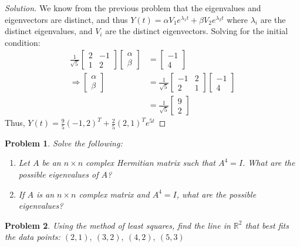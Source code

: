 \documentclass{article}
\theoremstyle{mystyle}
\newtheorem{problem}{Problem}[section]
\begin{document}
\begin{proof}[Solution]
We know from the previous problem that the eigenvalues and eigenvectors are distinct, and thus $Y(t) = \alpha V_1 e^{\lambda_1 t} + \beta V_2 e^{\lambda_2 t}$ where $\lambda_{i}$ are the distinct eigenvalues, and $V_{i}$ are the distinct eigenvectors. Solving for the initial condition:
%
\begin{align*}
    \frac{1}{\sqrt{5}}\begin{bmatrix} 2 & -1 \\ 1 & 2 \end{bmatrix}  \begin{bmatrix} \alpha \\ \beta \end{bmatrix} &= \begin{bmatrix} -1 \\ 4 \end{bmatrix}\\    
    \Rightarrow \begin{bmatrix} \alpha \\ \beta \end{bmatrix} &= \frac{1}{\sqrt{5}}\begin{bmatrix} -1 & 2 \\ 2 & 1 \end{bmatrix} \begin{bmatrix} -1 \\ 4 \end{bmatrix}\\
    &= \frac{1}{\sqrt{5}} \begin{bmatrix} 9 \\ 2 \end{bmatrix}
\end{align*}
Thus, $Y(t) = \frac{9}{5}(-1,2)^T + \frac{2}{5} (2,1)^T e^{5t}$ 
\end{proof}
\begin{problem}
Solve the following:
\begin{enumerate}
    \item Let $A$ be an $n\times n$ complex Hermitian matrix such that $A^4=I$. What are the possible eigenvalues of $A$?
    \item If $A$ is an $n\times n$ complex matrix and $A^4 = I$, what are the possible eigenvalues?
\end{enumerate}
\end{problem}
\begin{problem}
Using the method of least squares, find the line in $\mathbb{R}^2$ that best fits the data points: $(2,1),\ (3,2),\ (4,2),\ (5,3)$
\end{problem}
\end{document}
